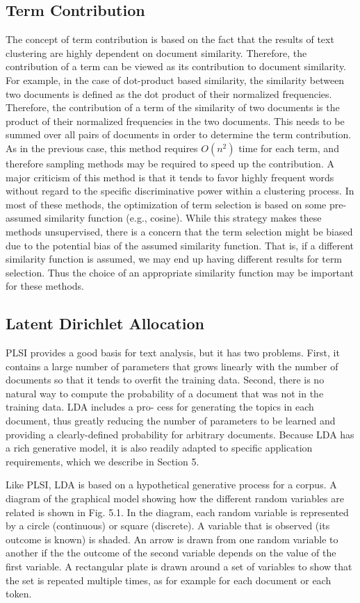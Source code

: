 \subsection{Term Contribution}
The concept of term contribution \cite{Liu2003} is based on the fact that the results of text clustering are highly dependent on document similarity. Therefore, the contribution of a term can be viewed as its contribution to document similarity. For example, in the case of dot-product based similarity, the similarity between two documents is defined as the dot product of their normalized frequencies. Therefore, the contribution of a term of the similarity of two documents is the product of their normalized frequencies in the two documents. This needs to be summed over all pairs of documents in order to determine the term contribution. As in the previous case, this method requires $O(n^2)$ time for each term, and therefore sampling methods may be required to speed up the contribution. A major criticism of this method is that it tends to favor highly frequent words without regard to the specific discriminative power within a clustering process. In most of these methods, the optimization of term selection is based on some pre-assumed similarity function (e.g., cosine). While this strategy makes these methods unsupervised, there is a concern that the term selection might be biased due to the potential bias of the assumed similarity function. That is, if a different similarity function is assumed, we may end up having different results for term selection. Thus the choice of an appropriate similarity function may be important for these methods.


\subsection{Latent Dirichlet Allocation}
PLSI provides a good basis for text analysis, but it has two problems. First, it contains a large number of parameters that grows linearly with the number of documents so that it tends to overfit the training data. Second, there is no natural way to compute the probability of a document that was not in the training data. LDA includes a pro- cess for generating the topics in each document, thus greatly reducing the number of parameters to be learned and providing a clearly-defined probability for arbitrary documents. Because LDA has a rich generative model, it is also readily adapted to specific application requirements, which we describe in Section 5.

Like PLSI, LDA is based on a hypothetical generative process for a corpus. A diagram of the graphical model showing how the different random variables are related is shown in Fig. 5.1. In the diagram, each random variable is represented by a circle (continuous) or square (discrete). A variable that is observed (its outcome is known) is shaded. An arrow is drawn from one random variable to another if the the outcome of the second variable depends on the value of the first variable. A rectangular plate is drawn around a set of variables to show that the set is repeated multiple times, as for example for each document or each token.

